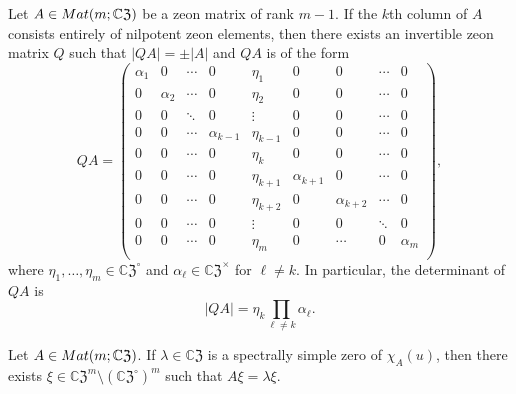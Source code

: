 \documentclass[10pt,a4paper]{amsart}
\newcommand{\CZ}{\mathbb{C}\mathfrak{Z}}
\newcommand{\Mat}{{\rm Mat}}
\begin{document}
\begin{lemma}\label{row reduction I}
Let $A\in\Mat(m;\CZ)$ be a zeon matrix of rank $m-1$.  If the $k$th column of $A$ consists entirely of nilpotent zeon elements, then there exists an invertible zeon matrix $Q$ such that $|QA|=\pm |A|$ and $QA$ is of the form \begin{equation}\label{QA matrix}
QA=\begin{pmatrix}
\alpha_1&0 &\cdots&0&\eta_1&0&0&\cdots&0\\
0&\alpha_2 & \cdots&0&\eta_2&0&0&\cdots&0\\
0&0&\ddots&0&\vdots&0&0&\cdots&0\\
0&0&\cdots&\alpha_{k-1}&\eta_{k-1}&0&0&\cdots&0\\
0&0&\cdots&0&\eta_{k}&0&0&\cdots&0\\
0&0&\cdots&0&\eta_{k+1}&\alpha_{k+1}&0&\cdots&0\\
0&0&\cdots&0&\eta_{k+2}&0&\alpha_{k+2}&\cdots&0\\
0&0&\cdots&0&\vdots&0&0&\ddots&0\\
0&0&\cdots&0&\eta_{m}&0&\cdots&0&\alpha_m\\
\end{pmatrix},
\end{equation}
where $\eta_1, \ldots, \eta_m\in\CZ^\circ$ and $\alpha_\ell\in\CZ^\times$ for $\ell\ne k$.  In particular, the determinant of $QA$ is \begin{equation*}
|QA|=\eta_k\prod_{\ell\ne k}\alpha_\ell.
\end{equation*}
\end{lemma}

\begin{theorem}\label{row reduction II}
Let $A\in\Mat(m;\CZ)$.  If $\lambda\in\CZ$ is a spectrally simple zero of $\chi_A(u)$, then there exists $\xi\in{\CZ}^m\setminus ({\CZ}^\circ)^m$ such that  $A\xi=\lambda\xi$.
\end{theorem}
\end{document}
